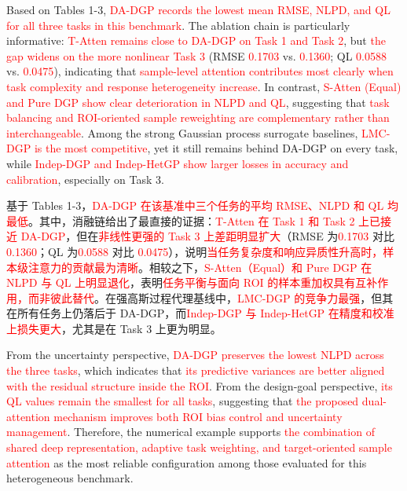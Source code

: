 \documentclass[11pt]{article}
\begin{document}
Based on Tables 1-3, \textcolor{red}{DA-DGP records the lowest mean RMSE, NLPD, and QL for all three tasks in this benchmark}. The ablation chain is particularly informative: \textcolor{red}{T-Atten remains close to DA-DGP on Task 1 and Task 2}, but \textcolor{red}{the gap widens on the more nonlinear Task 3} (RMSE \textcolor{red}{0.1703} vs. \textcolor{red}{0.1360}; QL \textcolor{red}{0.0588} vs. \textcolor{red}{0.0475}), indicating that \textcolor{red}{sample-level attention contributes most clearly when task complexity and response heterogeneity increase}. In contrast, \textcolor{red}{S-Atten (Equal) and Pure DGP show clear deterioration in NLPD and QL}, suggesting that \textcolor{red}{task balancing and ROI-oriented sample reweighting are complementary rather than interchangeable}. Among the strong Gaussian process surrogate baselines, \textcolor{red}{LMC-DGP is the most competitive}, yet it still remains behind DA-DGP on every task, while \textcolor{red}{Indep-DGP and Indep-HetGP show larger losses in accuracy and calibration}, especially on Task 3.

基于 Tables 1-3，\textcolor{red}{DA-DGP 在该基准中三个任务的平均 RMSE、NLPD 和 QL 均最低}。其中，消融链给出了最直接的证据：\textcolor{red}{T-Atten 在 Task 1 和 Task 2 上已接近 DA-DGP}，但在\textcolor{red}{非线性更强的 Task 3 上差距明显扩大}（RMSE 为\textcolor{red}{0.1703} 对比 \textcolor{red}{0.1360}；QL 为\textcolor{red}{0.0588} 对比 \textcolor{red}{0.0475}），说明\textcolor{red}{当任务复杂度和响应异质性升高时，样本级注意力的贡献最为清晰}。相较之下，\textcolor{red}{S-Atten（Equal）和 Pure DGP 在 NLPD 与 QL 上明显退化}，表明\textcolor{red}{任务平衡与面向 ROI 的样本重加权具有互补作用，而非彼此替代}。在强高斯过程代理基线中，\textcolor{red}{LMC-DGP 的竞争力最强}，但其在所有任务上仍落后于 DA-DGP，而\textcolor{red}{Indep-DGP 与 Indep-HetGP 在精度和校准上损失更大}，尤其是在 Task 3 上更为明显。

From the uncertainty perspective, \textcolor{red}{DA-DGP preserves the lowest NLPD across the three tasks}, which indicates that \textcolor{red}{its predictive variances are better aligned with the residual structure inside the ROI}. From the design-goal perspective, \textcolor{red}{its QL values remain the smallest for all tasks}, suggesting that \textcolor{red}{the proposed dual-attention mechanism improves both ROI bias control and uncertainty management}. Therefore, the numerical example supports \textcolor{red}{the combination of shared deep representation, adaptive task weighting, and target-oriented sample attention} as the most reliable configuration among those evaluated for this heterogeneous benchmark.
\end{document}
